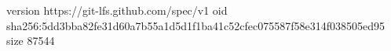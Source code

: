 version https://git-lfs.github.com/spec/v1
oid sha256:5dd3bba82fe31d60a7b55a1d5d1f1ba41c52cfec075587f58e314f038505ed95
size 87544
